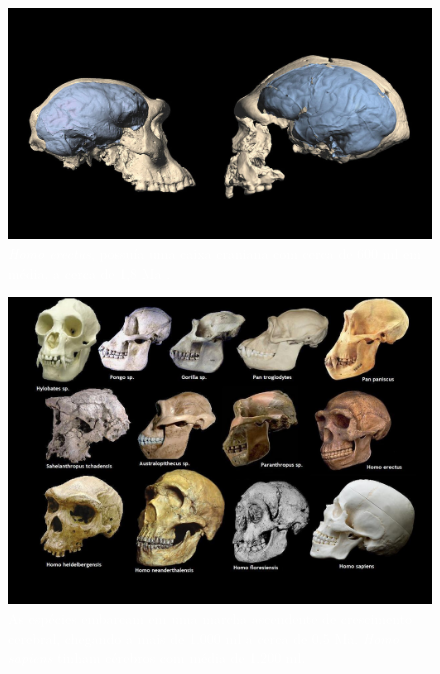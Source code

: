 \documentclass[aspectratio=169]{beamer} %
\begin{document}
{\begin{frame}
    \begin{minipage}{0.5\textwidth}
	    \begin{figure}
	\centering
        \includegraphics[scale=0.5]{images/cerebros.jpg} %
		    \caption{\textcolor{white}{\textit{Homo erectus}, possuía uma caixa craniana com cerca de 600 ml em média, a cerca de 1,8 Ma .}} %
	    \end{figure}
    \end{minipage}%
		\pause
    \begin{minipage}{0.5\textwidth}
	    \begin{figure}
        \centering
        \includegraphics[scale=0.2]{images/anatomia-primata.jpg} %
		    \caption{\textcolor{white}{As espécies embarcam em uma marcha ascendente de crescimento cerebral, chegando a mais de 1.000 ml a cerca de 0.5 Ma. \textit{Homo sapiens} tinham cérebros com média de 1.200 ml. }} %
	    \end{figure}
    \end{minipage}

\flushright
		\textcolor{blue}{\citep{Lindhout2024}}
		
	\end{frame}
}
\end{document}

